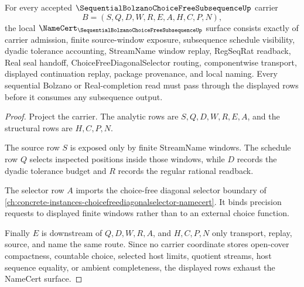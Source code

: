 \begin{theorem}
\label{thm:sequential-bolzano-choice-free-subsequence-namecert-obligations}
For every accepted $\SequentialBolzanoChoiceFreeSubsequenceUp$ carrier
$$
B=(S,Q,D,W,R,E,A,H,C,P,N),
$$
the local $\NameCert_{\SequentialBolzanoChoiceFreeSubsequenceUp}$ surface consists exactly of carrier admission, finite source-window exposure, subsequence schedule visibility, dyadic tolerance accounting, StreamName window replay, RegSeqRat readback, Real seal handoff, ChoiceFreeDiagonalSelector routing, componentwise transport, displayed continuation replay, package provenance, and local naming. Every sequential Bolzano or Real-completion read must pass through the displayed rows before it consumes any subsequence output.
\end{theorem}
\begin{proof}
Project the carrier. The analytic rows are $S,Q,D,W,R,E,A$, and the structural rows are $H,C,P,N$.

The source row $S$ is exposed only by finite StreamName windows. The schedule row $Q$ selects inspected positions inside those windows, while $D$ records the dyadic tolerance budget and $R$ records the regular rational readback.

The selector row $A$ imports the choice-free diagonal selector boundary of \autoref{ch:concrete-instances-choicefreediagonalselector-namecert}. It binds precision requests to displayed finite windows rather than to an external choice function.

Finally $E$ is downstream of $Q,D,W,R,A$, and $H,C,P,N$ only transport, replay, source, and name the same route. Since no carrier coordinate stores open-cover compactness, countable choice, selected host limits, quotient streams, host sequence equality, or ambient completeness, the displayed rows exhaust the NameCert surface.
\end{proof}

